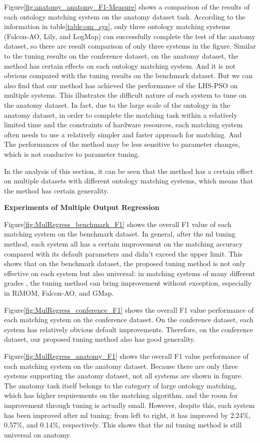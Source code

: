 \documentclass[twoside]{article}
\begin{document}
Figure\ref{fig:anatomy_anatomy_F1-Measure} shows a comparison of the results of each ontology matching system on the anatomy dataset task.
According to the information in table\ref{table:om_sys}, only three ontology matching systems (Falcon-AO, Lily, and LogMap) can successfully complete the test of the anatomy dataset, so there are result comparison of only three systems in the figure.
Similar to the tuning results on the conference dataset, on the anatomy dataset, the method has certain effects on each ontology matching system. And it is not obvious compared with the tuning results on the benchmark dataset.
But we can also find that our method has achieved the performance of the LHS-PSO on multiple systems.
This illustrates the difficult nature of each system to tune on the anatomy dataset.
In fact, due to the large scale of the ontology in the anatomy dataset, in order to complete the matching task within a relatively limited time and the constraints of hardware resources, each matching system often needs to use a relatively simpler and faster approach for matching. And The performances of the method may be less sensitive to parameter changes, which is not conducive to parameter tuning.

In the analysis of this section, it can be seen that the method has a certain effect on multiple datasets with different ontology matching systems, which means that the method has certain generality.

{\bf Experiments of Multiple Output Regression}

Figure\ref{fig:MulRegress_benchmark_F1} shows the overall F1 value of each matching system on the benchmark dataset.
In general, after the ml tuning method, each system all has a certain improvement on the matching accuracy compared with its default parameters and didn't exceed the upper limit. This shows that on the benchmark dataset, the proposed tuning method is not only effective on each system but also universal: in matching systems of many different grades , the tuning method can bring improvement without exception, especially in RiMOM, Falcon-AO, and GMap.

Figure\ref{fig:MulRegress_conference_F1} shows the overall F1 value performance of each matching system on the conference dataset.
On the conference dataset, each system has relatively obvious default improvements. Therefore, on the conference dataset, our proposed tuning method also has good generality.

Figure\ref{fig:MulRegress_anatomy_F1} shows the overall F1 value performance of each matching system on the anatomy dataset.
Because there are only three systems supporting the anatomy dataset, not all systems are shown in fugure.
The anatomy task itself belongs to the category of large ontology matching, which has higher requirements on the matching algorithm, and the room for improvement through tuning is actually small.
However, despite this, each system has been improved after ml tuning: from left to right, it has improved by 2.24\%, 0.57\%, and 0.14\%, respectively. This shows that the ml tuning method is still universal on anatomy.
\end{document}
